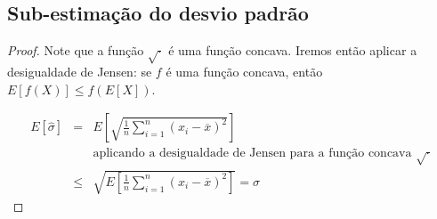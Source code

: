\subsection{Sub-estimação do desvio padrão}

\begin{questions}

\begin{solution}
  \begin{proof}

  Note que a função $\sqrt{\cdot}$ é uma função concava. Iremos então aplicar a desigualdade de Jensen:
  se $f$ é uma função concava, então $E\left[ f(X) \right] \leq f \left( E \left[ X \right] \right)$.

  \begin{eqnarray}
  E \left[ \widehat{\sigma} \right] &=& E \left[ \sqrt{ \frac{1}{n} \sum_{i=1}^n \left( x_i - \overline{x} \right)^2 } \right] \nonumber \\
        && \text{aplicando a desigualdade de Jensen para a função concava $\sqrt{\cdot}$} \nonumber \\
        &\leq& \sqrt{ E \left[ \frac{1}{n} \sum_{i=1}^n \left( x_i - \overline{x} \right)^2 \right]  } = \sigma 
  \end{eqnarray}

  \end{proof}
\end{solution}
\end{questions}
